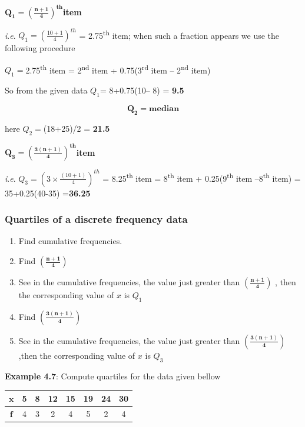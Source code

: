 \documentclass[
]{book}
\begin{document}
\(\mathbf{Q}_{\mathbf{1}}\mathbf{=}\left(\frac{\mathbf{n + 1}}{\mathbf{4}} \right)^{\mathbf{\text{th}}}\)\textbf{item}

\emph{i}.\emph{e}. \(Q_{1} = \left( \frac{10 + 1}{4} \right)^{th}\) = 2.75\textsuperscript{th} item;
when such a fraction appears we use the following procedure

\(Q_{1} =\)2.75\textsuperscript{th} item = 2\textsuperscript{nd} item + 0.75(3\textsuperscript{rd} item -- 2\textsuperscript{nd}
item)

So from the given data \(Q_{1}\)= 8+0.75(10-- 8) = \textbf{9.5}

\[\mathbf{Q}_{\mathbf{2}}\mathbf{= median}\]

here \(Q_{2} =\)(18+25)/2 = \textbf{21.5}

\(\mathbf{Q}_{\mathbf{3}}\mathbf{=}\left( \frac{\mathbf{3(n + 1)}}{\mathbf{4}} \right)^{\mathbf{\text{th}}}\)\textbf{item}

\emph{i}.\emph{e}. \(Q_{3} = \left( 3 \times \frac{(10 + 1)}{4} \right)^{th}\) =
8.25\textsuperscript{th} item = 8\textsuperscript{th} item + 0.25(9\textsuperscript{th} item --8\textsuperscript{th} item) =
35+0.25(40-35) =\textbf{36.25}

\subsubsection{Quartiles of a discrete frequency data}\label{quartiles-of-a-discrete-frequency-data}

\begin{enumerate}
\def\labelenumi{\arabic{enumi}.}
\item
  Find cumulative frequencies.
\item
  Find \(\left( \frac{\mathbf{n + 1}}{\mathbf{4}} \right)\)
\item
  See in the cumulative frequencies, the value just greater than
  \(\left( \frac{\mathbf{n + 1}}{\mathbf{4}} \right)\) , then the
  corresponding value of \(x\) is \(Q_{1}\)
\item
  Find \(\left( \frac{\mathbf{3(n + 1)}}{\mathbf{4}} \right)\)
\item
  See in the cumulative frequencies, the value just greater than
  \(\left( \frac{\mathbf{3(n + 1)}}{\mathbf{4}} \right)\) ,then the
  corresponding value of \(x\) is \(Q_{3}\)
\end{enumerate}

\textbf{Example 4.7}: Compute quartiles for the data given bellow

\begin{longtable}[]{@{}cccccccc@{}}
\toprule\noalign{}
\(\mathbf{x}\) & 5 & 8 & 12 & 15 & 19 & 24 & 30 \\
\midrule\noalign{}
\endhead
\bottomrule\noalign{}
\endlastfoot
\(\mathbf{f}\) & 4 & 3 & 2 & 4 & 5 & 2 & 4 \\
\end{longtable}
\end{document}
